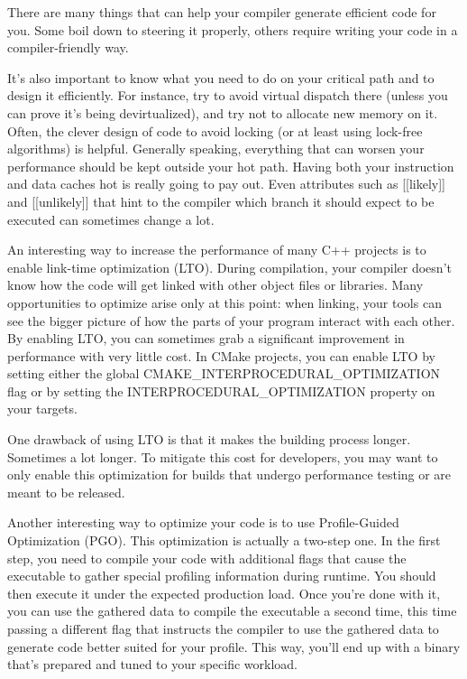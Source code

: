 
There are many things that can help your compiler generate efficient code for you. Some boil down to steering it properly, others require writing your code in a compiler-friendly way.

It's also important to know what you need to do on your critical path and to design it efficiently. For instance, try to avoid virtual dispatch there (unless you can prove it's being devirtualized), and try not to allocate new memory on it. Often, the clever design of code to avoid locking (or at least using lock-free algorithms) is helpful. Generally speaking, everything that can worsen your performance should be kept outside your hot path. Having both your instruction and data caches hot is really going to pay out. Even attributes such as [[likely]] and [[unlikely]] that hint to the compiler which branch it should expect to be executed can sometimes change a lot.


An interesting way to increase the performance of many C++ projects is to enable link-time optimization (LTO). During compilation, your compiler doesn't know how the code will get linked with other object files or libraries. Many opportunities to optimize arise only at this point: when linking, your tools can see the bigger picture of how the parts of your program interact with each other. By enabling LTO, you can sometimes grab a significant improvement in performance with very little cost. In CMake projects, you can enable LTO by setting either the global CMAKE\_INTERPROCEDURAL\_OPTIMIZATION flag or by setting the INTERPROCEDURAL\_OPTIMIZATION property on your targets.

One drawback of using LTO is that it makes the building process longer. Sometimes a lot longer. To mitigate this cost for developers, you may want to only enable this optimization for builds that undergo performance testing or are meant to be released.


Another interesting way to optimize your code is to use Profile-Guided Optimization (PGO). This optimization is actually a two-step one. In the first step, you need to compile your code with additional flags that cause the executable to gather special profiling information during runtime. You should then execute it under the expected production load. Once you're done with it, you can use the gathered data to compile the executable a second time, this time passing a different flag that instructs the compiler to use the gathered data to generate code better suited for your profile. This way, you'll end up with a binary that's prepared and tuned to your specific workload.


